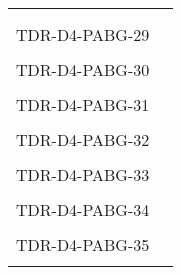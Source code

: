 \begin{longtable}{|p{2cm}|p{12cm}|@{}}
\begin{minipage}{12cm}
\end{minipage}\\
\\
\hline  
TDR-D4-PABG-29&
\begin{minipage}{12cm}
\end{minipage}\\
\\
\hline  
TDR-D4-PABG-30&
\begin{minipage}{12cm}
\end{minipage}\\
\\
\hline  
TDR-D4-PABG-31&
\begin{minipage}{12cm}
\end{minipage}\\
\\
\hline 
TDR-D4-PABG-32&
\begin{minipage}{12cm}
\end{minipage}\\
\\
\hline  
TDR-D4-PABG-33&
\begin{minipage}{12cm}
\end{minipage}\\
\\
\hline  
TDR-D4-PABG-34&
\begin{minipage}{12cm}
\end{minipage}\\
\\
\hline  
TDR-D4-PABG-35&
\begin{minipage}{12cm}
\end{minipage}\\
\\
\hline 
\end{longtable}
\normalsize

\clearpage
